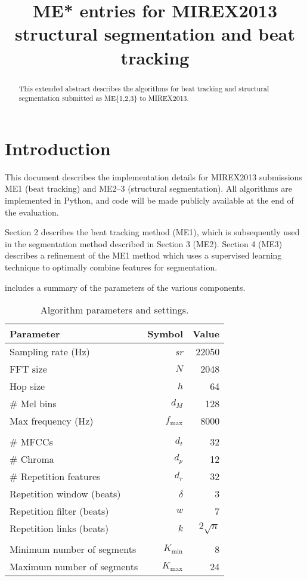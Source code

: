 \documentclass{article}
\title{ME* entries for MIREX2013 structural segmentation and beat tracking}
\begin{document}
%
\maketitle
%
\begin{abstract}
This extended abstract describes the algorithms for beat tracking and structural segmentation submitted as ME\{1,2,3\} to MIREX2013.
\end{abstract}
%
\section{Introduction}
\label{sec:introduction}

This document describes the implementation details for MIREX2013 submissions ME1 (beat tracking) and ME2--3
(structural segmentation).  All algorithms are implemented in Python, and code will be made publicly available
at the end of the evaluation.

Section 2 describes the beat tracking method (ME1), which is subsequently used in the segmentation method 
described in Section 3 (ME2).  Section 4 (ME3) describes a refinement of the ME1 method which uses a supervised
learning technique to optimally combine features for segmentation.

 includes a summary of the parameters of the various components.

\begin{table}
\caption{Algorithm parameters and settings.\label{tab:parameters}}
\centering\begin{tabular}{lrr}
\toprule%
Parameter           & Symbol    & Value\\
\hline
Sampling rate (Hz)  & \em{sr}   & 22050\\
FFT size            & $N$       & 2048\\
Hop size            & $h$       & 64\\
\# Mel bins         & $d_M$       & 128\\
Max frequency (Hz)  & $f_{\max}$  & 8000\\
\\
\# MFCCs            & $d_t$     &   32\\
\# Chroma           & $d_p$     &   12\\
\# Repetition features      & $d_r$     &   32\\
Repetition window (beats)   & $\delta$  &   3\\
Repetition filter (beats)   & $w$       &   7\\
Repetition links (beats)    & $k$       &   $2\sqrt{n}$\\
\\
Minimum number of segments  & $K_{\min}$ & 8\\
Maximum number of segments  & $K_{\max}$ & 24\\
\bottomrule%
\end{tabular}
\end{table}
\end{document}
